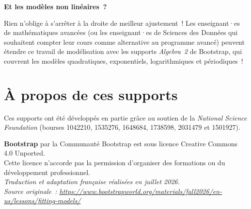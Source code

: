 \documentclass[12pt,a4paper]{article}
\begin{document}
\begin{instructornotes}
  \textbf{Et les modèles non linéaires~?}

  Rien n'oblige à s'arrêter à la droite de meilleur ajustement~! Les enseignant·es de mathématiques avancées (ou les enseignant·es de Sciences des Données qui souhaitent compter leur cours comme alternative au programme avancé) peuvent étendre ce travail de modélisation avec les supports \emph{Algebra~2} de Bootstrap, qui couvrent les modèles quadratiques, exponentiels, logarithmiques et périodiques~!
\end{instructornotes}

\section*{À propos de ces supports}

Ces supports ont été développés en partie grâce au soutien de la \emph{National Science Foundation} (bourses 1042210, 1535276, 1648684, 1738598, 2031479 et 1501927).

\begin{center}
  \textbf{Bootstrap} par la Communauté Bootstrap est sous licence Creative Commons 4.0 Unported.\\
  Cette licence n'accorde pas la permission d'organiser des formations ou du développement professionnel.\\[1em]
  \textit{Traduction et adaptation française réalisées en juillet 2026.}\\
  \textit{Source originale~: \url{https://www.bootstrapworld.org/materials/fall2026/en-us/lessons/fitting-models/}}
\end{center}
\end{document}
